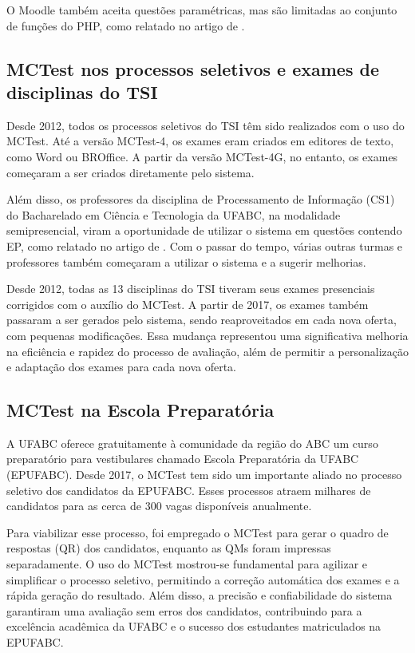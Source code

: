 O Moodle também aceita questões paramétricas, mas são limitadas ao conjunto de funções do PHP, como relatado no artigo de .

\subsection{MCTest nos processos seletivos e exames de disciplinas do TSI}

Desde 2012, todos os processos seletivos do TSI têm sido realizados com o uso do MCTest. Até a versão MCTest-4, os exames eram criados em editores de texto, como Word ou BROffice. A partir da versão MCTest-4G, no entanto, os exames começaram a ser criados diretamente pelo sistema.

Além disso, os professores da disciplina de Processamento de Informação (CS1) do Bacharelado em Ciência e Tecnologia da UFABC, na modalidade semipresencial, viram a oportunidade de utilizar o sistema em questões contendo EP, como relatado no artigo de . Com o passar do tempo, várias outras turmas e professores também começaram a utilizar o sistema e a sugerir melhorias.

Desde 2012, todas as 13 disciplinas do TSI tiveram seus exames presenciais corrigidos com o auxílio do MCTest. A partir de 2017, os exames também passaram a ser gerados pelo sistema, sendo reaproveitados em cada nova oferta, com pequenas modificações. Essa mudança representou uma significativa melhoria na eficiência e rapidez do processo de avaliação, além de permitir a personalização e adaptação dos exames para cada nova oferta.

\subsection{MCTest na Escola Preparatória}

A UFABC oferece gratuitamente à comunidade da região do ABC um curso preparatório para vestibulares chamado Escola Preparatória da UFABC (EPUFABC). Desde 2017, o MCTest tem sido um importante aliado no processo seletivo dos candidatos da EPUFABC. Esses processos atraem milhares de candidatos para as cerca de 300 vagas disponíveis anualmente.

Para viabilizar esse processo, foi empregado o MCTest para gerar o quadro de respostas (QR) dos candidatos, enquanto as QMs foram impressas separadamente. O uso do MCTest mostrou-se fundamental para agilizar e simplificar o processo seletivo, permitindo a correção automática dos exames e a rápida geração do resultado. Além disso, a precisão e confiabilidade do sistema garantiram uma avaliação sem erros dos candidatos, contribuindo para a excelência acadêmica da UFABC e o sucesso dos estudantes matriculados na EPUFABC.

